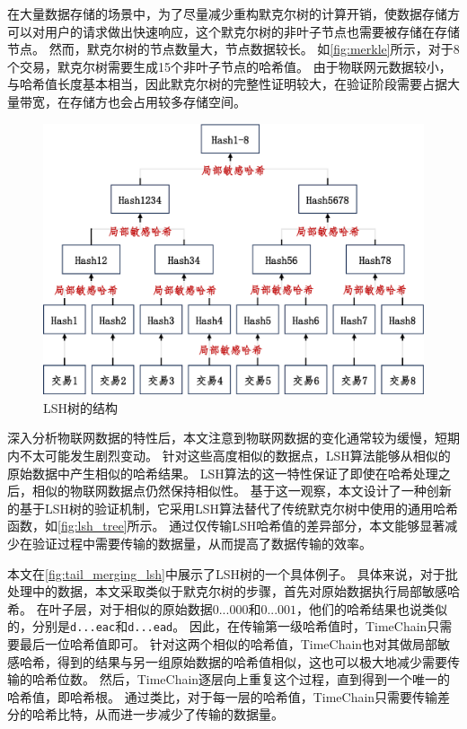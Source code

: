 在大量数据存储的场景中，为了尽量减少重构默克尔树的计算开销，使数据存储方可以对用户的请求做出快速响应，这个默克尔树的非叶子节点也需要被存储在存储节点。
然而，默克尔树的节点数量大，节点数据较长。
如\autoref{fig:merkle}所示，对于8个交易，默克尔树需要生成15个非叶子节点的哈希值。
由于物联网元数据较小，与哈希值长度基本相当，因此默克尔树的完整性证明较大，在验证阶段需要占据大量带宽，在存储方也会占用较多存储空间。

\begin{figure}[t]
    \centering
    \includegraphics[width=0.85\linewidth]{figures/timechain/lsh_constructure.pdf}
    \caption{LSH树的结构}
    \label{fig:lsh_tree}
\end{figure}

深入分析物联网数据的特性后，本文注意到物联网数据的变化通常较为缓慢，短期内不太可能发生剧烈变动。
针对这些高度相似的数据点，LSH算法能够从相似的原始数据中产生相似的哈希结果。
LSH算法的这一特性保证了即使在哈希处理之后，相似的物联网数据点仍然保持相似性。
基于这一观察，本文设计了一种创新的基于LSH树的验证机制，它采用LSH算法替代了传统默克尔树中使用的通用哈希函数，如\autoref{fig:lsh_tree}所示。
通过仅传输LSH哈希值的差异部分，本文能够显著减少在验证过程中需要传输的数据量，从而提高了数据传输的效率。

本文在\autoref{fig:tail_merging_lsh}中展示了LSH树的一个具体例子。
具体来说，对于批处理中的数据，本文采取类似于默克尔树的步骤，首先对原始数据执行局部敏感哈希。
在叶子层，对于相似的原始数据$0...000$和$0...001$，他们的哈希结果也说类似的，分别是\texttt{d...eac}和\texttt{d...ead}。
因此，在传输第一级哈希值时，TimeChain只需要最后一位哈希值即可。
针对这两个相似的哈希值，TimeChain也对其做局部敏感哈希，得到的结果与另一组原始数据的哈希值相似，这也可以极大地减少需要传输的哈希位数。
然后，TimeChain逐层向上重复这个过程，直到得到一个唯一的哈希值，即哈希根。
通过类比，对于每一层的哈希值，TimeChain只需要传输差分的哈希比特，从而进一步减少了传输的数据量。


